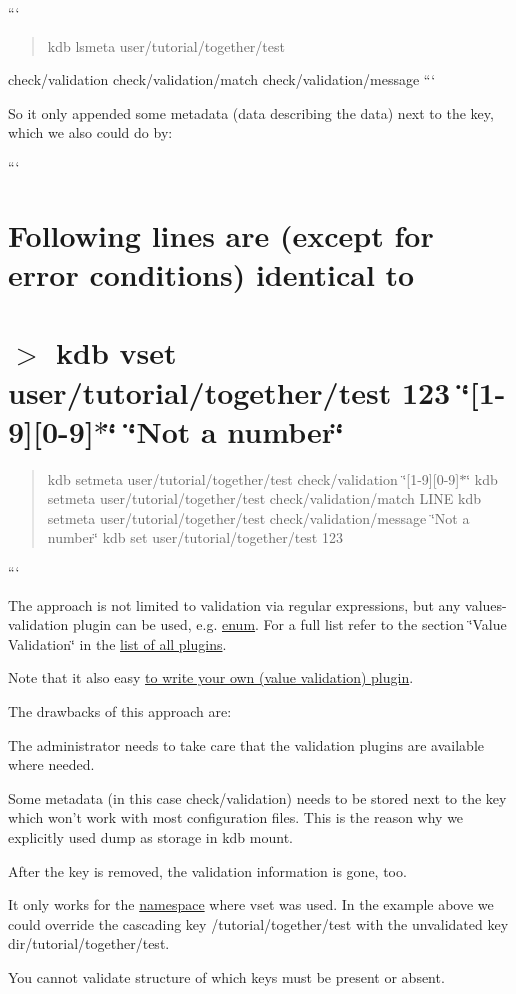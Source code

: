 ``` \begin{quote}
kdb lsmeta user/tutorial/together/test \end{quote}
check/validation check/validation/match check/validation/message ```

So it only appended some metadata (data describing the data) next to the key, which we also could do by\+:

``` \section*{Following lines are (except for error conditions) identical to}

\section*{$>$ kdb vset user/tutorial/together/test 123 \char`\"{}\mbox{[}1-\/9\mbox{]}\mbox{[}0-\/9\mbox{]}$\ast$\char`\"{} \char`\"{}\+Not a number\char`\"{}}

\begin{quote}
kdb setmeta user/tutorial/together/test check/validation \char`\"{}\mbox{[}1-\/9\mbox{]}\mbox{[}0-\/9\mbox{]}$\ast$\char`\"{} kdb setmeta user/tutorial/together/test check/validation/match L\+I\+N\+E kdb setmeta user/tutorial/together/test check/validation/message \char`\"{}\+Not a number\char`\"{} kdb set user/tutorial/together/test 123 \end{quote}
```

The approach is not limited to validation via regular expressions, but any values-\/validation plugin can be used, e.\+g. \hyperlink{md_src_plugins_enum_README_src_plugins_enum_README_md}{enum}. For a full list refer to the section \char`\"{}\+Value Validation\char`\"{} in the \hyperlink{md_src_plugins_README_src_plugins_README_md}{list of all plugins}.

Note that it also easy \hyperlink{doc_tutorials_plugins_md}{to write your own (value validation) plugin}.

The drawbacks of this approach are\+:


\begin{DoxyItemize}
\item The administrator needs to take care that the validation plugins are available where needed.
\item Some metadata (in this case {\ttfamily check/validation}) needs to be stored next to the key which won't work with most configuration files. This is the reason why we explicitly used {\ttfamily dump} as storage in {\ttfamily kdb mount}.
\item After the key is removed, the validation information is gone, too.
\item It only works for the \hyperlink{doc_tutorials_namespaces_md}{namespace} where {\ttfamily vset} was used. In the example above we could override the cascading key {\ttfamily /tutorial/together/test} with the unvalidated key {\ttfamily dir/tutorial/together/test}.
\item You cannot validate structure of which keys must be present or absent.
\end{DoxyItemize}

